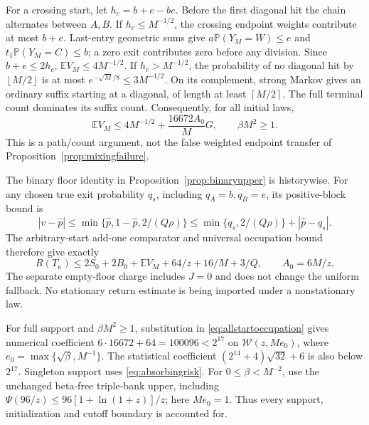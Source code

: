 \documentclass[11pt,letterpaper]{article}
\theoremstyle{definition}\newtheorem{definition}[theorem]{Definition}
\theoremstyle{remark}\newtheorem{remark}[theorem]{Remark}
\newcommand{\E}{\mathbb{E}}
\newcommand{\Prob}{\mathbb{P}}
\newcommand{\floor}[1]{\left\lfloor #1\right\rfloor}
\newcommand{\ceil}[1]{\left\lceil #1\right\rceil}
\begin{document}
For a crossing start, let $h_c=b+e-be$. Before the first diagonal hit the chain alternates between $A,B$. If $h_c\le M^{-1/2}$, the crossing endpoint weights contribute at most $b+e$. Last-entry geometric sums give
$a\Prob(Y_M=W)\le e$ and $t_1\Prob(Y_M=C)\le b$; a zero exit contributes zero before any division. Since $b+e\le2h_c$,
$\E V_M\le4M^{-1/2}$.
If $h_c>M^{-1/2}$, the probability of no diagonal hit by $\floor{M/2}$ is at most
$e^{-\sqrt M/8}\le3M^{-1/2}$.
On its complement, strong Markov gives an ordinary suffix starting at a diagonal, of length at least $\ceil{M/2}$. The full terminal count dominates its suffix count. Consequently, for all initial laws,
\begin{equation}\label{eq:allstartoccupation}
 \E V_M\le4M^{-1/2}+\frac{16672A_0}{M}G,
 \qquad \beta M^2\ge1.
\end{equation}
This is a path/count argument, not the false weighted endpoint transfer of Proposition~\ref{prop:mixingfailure}.

The binary floor identity in Proposition~\ref{prop:binaryupper} is historywise. For any chosen true exit probability $q_s$, including $q_A=b,q_B=e$, its positive-block bound is
\[
 |v-\widehat p|\le\min\{\widehat p,1-\widehat p,2/(Q\rho)\}
 \le\min\{q_s,2/(Q\rho)\}+|\widehat p-q_s|.
\]
The arbitrary-start add-one comparator and universal occupation bound therefore give exactly
\begin{equation}\label{eq:allstartdecoder}
 R(T_\kappa)\le
 2S_0+2B_0+\E V_M+64/z+16/M+3/Q,\qquad A_0=6M/z.
\end{equation}
The separate empty-floor charge includes $J=0$ and does not change the uniform fallback. No stationary return estimate is being imported under a nonstationary law.

For full support and $\beta M^2\ge1$, substitution in \eqref{eq:allstartoccupation} gives numerical coefficient
$6\cdot16672+64=100096<2^{17}$
on $\mathcal W(z,Me_0)$, where $e_0=\max\{\sqrt\beta,M^{-1}\}$. The statistical coefficient
$(2^{14}+4)\sqrt{32}+6$ is also below $2^{17}$.
Singleton support uses \eqref{eq:absorbingrisk}. For $0\le\beta<M^{-2}$, use the unchanged beta-free triple-bank upper, including $\Psi(96/z)\le96[1+\ln(1+z)]/z$; here $Me_0=1$.
Thus every support, initialization and cutoff boundary is accounted for.
\end{document}
